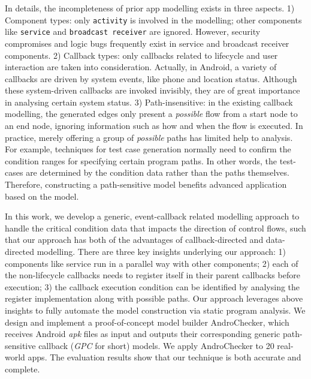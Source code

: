
In details, the incompleteness of prior app modelling exists in three aspects. 1) Component types: only \texttt{activity} is involved in the modelling; other components like \texttt{service} and \texttt{broadcast receiver} are ignored. However, security compromises and logic bugs frequently exist in service and broadcast receiver components. 2) Callback types: only callbacks related to lifecycle and user interaction are taken into consideration. Actually, in Android, a variety of callbacks are driven by system events, like phone and location status. Although these system-driven callbacks are invoked invisibly, they are of great importance in analysing certain system status. 3) Path-insensitive: in the existing callback modelling, the generated edges only present a \textit{possible} flow from a start node to an end node, ignoring information such as how and when the flow is executed. In practice, merely offering a group of \textit{possible} paths has limited help to analysis. For example, techniques for test case generation normally need to confirm the condition ranges for specifying certain program paths. In other words, the test-cases are determined by the condition data rather than the paths themselves. Therefore, constructing a path-sensitive model benefits advanced application based on the model.    

In this work, we develop a generic, event-callback related modelling approach to handle the critical condition data that impacts the direction of control flows, such that our approach has both of the advantages of callback-directed and data-directed modelling. %
There are three key insights underlying our approach: 1) components like service run in a parallel way with other components; 2) each of the non-lifecycle callbacks needs to register itself in their parent callbacks before execution; 3) the callback execution condition can be identified by analysing the register implementation along with possible paths. Our approach leverages above insights to fully automate the model construction via static program analysis. 
%
We design and implement a proof-of-concept model builder AndroChecker, which receives Android \textit{apk} files as input and outputs their corresponding generic path-sensitive callback (\textit{GPC} for short) models. We apply AndroChecker to 20 real-world apps. The evaluation results show that our technique is both accurate and complete. 

